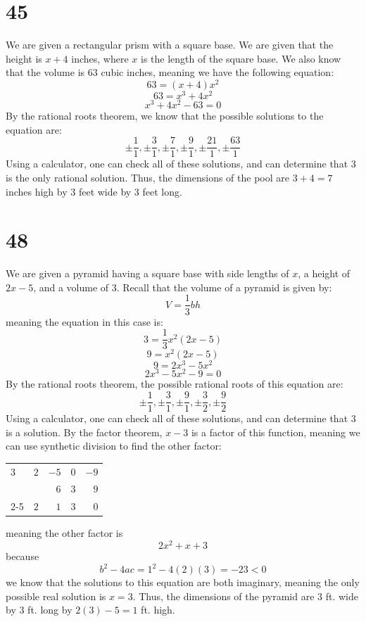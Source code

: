 \documentclass{article}
\theoremstyle{definition}
\begin{document}
\section*{45}
We are given a rectangular prism with a square base. We are given that the height is $x+4$ inches, where $x$ is the length of the square
base. We also know that the volume is $63$ cubic inches, meaning we have the following equation:
\[ 63=(x+4)x^2 \]
\[ 63=x^3+4x^2 \]
\[ x^3+4x^2-63=0 \]
By the rational roots theorem, we know that the possible solutions to the equation are:
\[ \pm\frac{1}{1},\pm\frac{3}{1},\pm\frac{7}{1},\pm\frac{9}{1},\pm\frac{21}{1},\pm\frac{63}{1} \]
Using a calculator, one can check all of these solutions, and can determine that $3$ is the only rational solution. 
Thus, the dimensions of the 
pool are $3+4=7$ inches high by $3$ feet wide by $3$ feet long.

\section*{48}
\setlength{\tabcolsep}{10pt}
We are given a pyramid having a square base with side lengths of $x$, a height of $2x-5$, and a volume of $3$. Recall that the 
volume of a pyramid is given by:
\[ V=\frac{1}{3}bh \] meaning the equation in this case is:
\[ 3=\frac{1}{3}x^2(2x-5) \]
\[ 9=x^2(2x-5) \]
\[ 9=2x^3-5x^2 \]
\[ 2x^3-5x^2-9=0 \]
By the rational roots theorem, the possible rational roots of this equation are:
\[ \pm\frac{1}{1},\pm\frac{3}{1},\pm\frac{9}{1},\pm\frac{3}{2},\pm\frac{9}{2} \]
Using a calculator, one can check all of these solutions, and can determine that $3$ is a solution. By the factor theorem, 
$x-3$ is a factor of this function, meaning we can use synthetic division to find the other factor:
\FloatBarrier
\begin{center}
	\begin{tabular}{l|rrrr}
		$3$ & $2$ & $-5$ & $0$ & $-9$ \\
		& & $6$ & $3$ & $9$ \\
		\cmidrule{2-5}
		& $2$ & $1$ & $3$ & $0$
	\end{tabular}
\end{center}
\FloatBarrier
meaning the other factor is \[ 2x^2+x+3 \] because \[ b^2-4ac=1^2-4(2)(3)=-23<0 \] we know that the solutions to this equation are both 
imaginary, meaning the only possible real solution is $x=3$. Thus, the dimensions of the pyramid are $3$ ft. wide by $3$ ft. long by 
$2(3)-5=1$ ft. high. 
\end{document}
